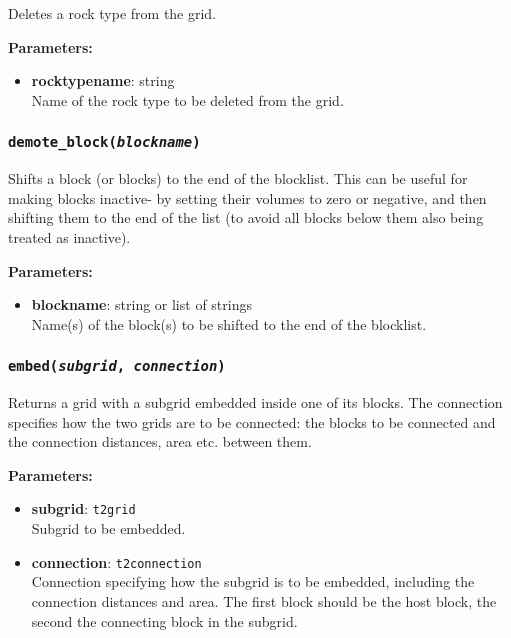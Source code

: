 Deletes a rock type from the grid.

\textbf{Parameters:}
\begin{itemize}
\item \textbf{rocktypename}: string\\
  Name of the rock type to be deleted from the grid.
\end{itemize}

\begin{snugshade}
\subsubsection{\texttt{demote\_block(\emph{blockname})}}
\end{snugshade}
\label{sec:t2grid:demote_block}

Shifts a block (or blocks) to the end of the blocklist.  This can be useful for making blocks inactive- by setting their volumes to zero or negative, and then shifting them to the end of the list (to avoid all blocks below them also being treated as inactive).

\textbf{Parameters:}
\begin{itemize}
\item \textbf{blockname}: string or list of strings\\
  Name(s) of the block(s) to be shifted to the end of the blocklist.
\end{itemize}

\begin{snugshade}
\subsubsection{\texttt{embed(\emph{subgrid}, \emph{connection})}}
\end{snugshade}
\label{sec:t2grid:embed}

Returns a grid with a subgrid embedded inside one of its blocks.  The connection specifies how the two grids are to be connected: the blocks to be connected and the connection distances, area etc. between them.

\textbf{Parameters:}
\begin{itemize}
\item \textbf{subgrid}: \texttt{t2grid}\\
  Subgrid to be embedded.
\item \textbf{connection}: \texttt{t2connection}\\
  Connection specifying how the subgrid is to be embedded, including the connection distances and area.  The first block should be the host block, the second the connecting block in the subgrid.
\end{itemize}

